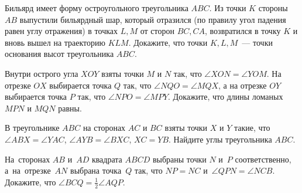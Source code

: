 \begin{problems}
\item Бильярд имеет форму остроугольного треугольника $ABC$. Из точки $K$ стороны $AB$ выпустили бильярдный шар, который отразился (по правилу угол падения равен углу отражения) в точках $L, M$ от сторон $BC, CA$, возвратился в точку $K$ и вновь вышел на траекторию $KLM$. Докажите, что точки $K, L, M$~--- точки основания высот треугольника $ABC$.

\item Внутри острого угла $XOY$ взяты точки $M$ и $N$ так, что $\angle XON = \angle YOM$. На отрезке $OX$ выбирается точка $Q$ так, что $\angle NQO = \angle MQX$, а на отрезке $OY$ выбирается точка $P$ так, что $\angle NPO = \angle MPY$. Докажите, что длины ломаных $MPN$ и $MQN$ равны.

\item В треугольнике $ABC$ на сторонах $AC$ и $BC$ взяты точки $X$ и $Y$ такие, что $\angle ABX = \angle YAC$, $\angle AYB = \angle BXC$, $XC = YB$. Найдите углы треугольника $ABC$.

\item На~сторонах $AB$ и~$AD$ квадрата $ABCD$ выбраны точки $N$ и~$P$ соответственно,
а~на~отрезке~$AN$ выбрана точка~$Q$ так, что $NP = NC$
и~$\angle QPN = \angle NCB$.
Докажите, что $\angle BCQ = \frac{1}{2} \angle AQP$.


\end{problems}

\renewcommand{\baselinestretch}{1}
\parskip
